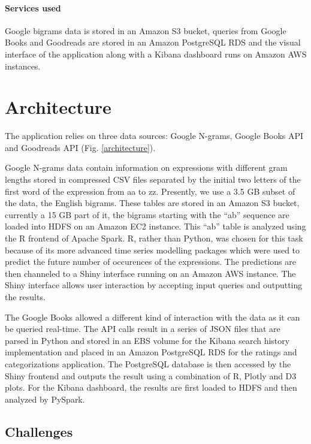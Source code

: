 \documentclass[12pt,letterpaper]{article}
\begin{document}
\paragraph{Services used} Google bigrams data is stored in an Amazon S3 bucket, queries from Google Books and Goodreads are stored in an Amazon PostgreSQL RDS and the visual interface of the application along with a Kibana 
dashboard runs on Amazon AWS instances.

\section{Architecture}

The application relies on three data sources: Google N-grams, Google Books API and Goodreads API (Fig. \ref{architecture}). 

Google N-grams data contain information on expressions with different gram lengths stored in compressed CSV files separated by the initial two letters of the first word of the expression from aa to zz. Presently, we use a 3.5 GB subset of the data, the English bigrams. These tables are stored in an Amazon S3 bucket, currently
a 15 GB part of it, the bigrams starting with the ``ab'' sequence are loaded into HDFS on an Amazon EC2 instance. This ``ab'' table is analyzed using the R frontend of Apache Spark. R, rather than Python, was chosen
for this task because of its more advanced time series modelling packages which were used to predict the future number of occurences of the expressions. The predictions are then channeled to a Shiny interface running
on an Amazon AWS instance. The Shiny interface allows user interaction by accepting input queries and outputting the results. 

The Google Books allowed a different kind of interaction with the data as it can be queried real-time. The API calls result in a series of JSON files that are parsed in Python and stored in an EBS volume for the 
Kibana search history implementation and placed in an Amazon PostgreSQL RDS for the ratings and categorizations application. The PostgreSQL database is then accessed by the Shiny frontend and outputs the result using 
a combination of R, Plotly and D3 plots. For the Kibana dashboard, the results are first loaded to HDFS and then analyzed by PySpark. 

\subsection{Challenges}
\end{document}
